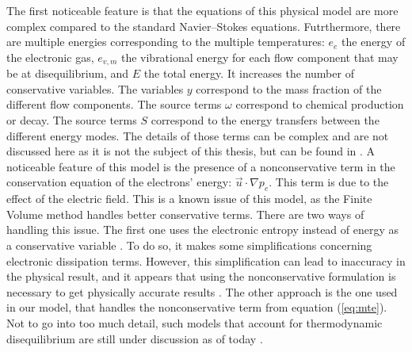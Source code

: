       The first noticeable feature is that the equations of this physical model are more complex compared to the standard Navier--Stokes equations.
      Futrthermore, there are multiple energies corresponding to the multiple temperatures: $e_e$ the energy of the electronic gas, $e_{v, m}$ the vibrational energy for each flow component that may be at disequilibrium, and $E$ the total energy.
      It increases the number of conservative variables.
      The variables $y$ correspond to the mass fraction of the different flow components.
      The source terms $\omega$ correspond to chemical production or decay.
      The source terms $S$ correspond to the energy transfers between the different energy modes.
      The details of those terms can be complex and are not discussed here as it is not the subject of this thesis, but can be found in \cite{Soubrie2006}.
      A noticeable feature of this model is the presence of a nonconservative term in the conservation equation of the electrons' energy: $\vec{u} \cdot \nabla p_e$.
      This term is due to the effect of the electric field.
      This is a known issue of this model, as the Finite Volume method handles better conservative terms.
      There are two ways of handling this issue.
      The first one uses the electronic entropy instead of energy as a conservative variable \cite{CoquelMarmignon1995}.
      To do so, it makes some simplifications concerning electronic dissipation terms.
      However, this simplification can lead to inaccuracy in the physical result, and it appears that using the nonconservative formulation is necessary to get physically accurate results \cite{Soubrie2006, KimGuelhanBoyd2012}.
      The other approach is the one used in our model, that handles the nonconservative term from equation (\ref{eq:mte}).
      Not to go into too much detail, such models that account for thermodynamic disequilibrium are still under discussion as of today \cite{BlancoJosyula2020}.


